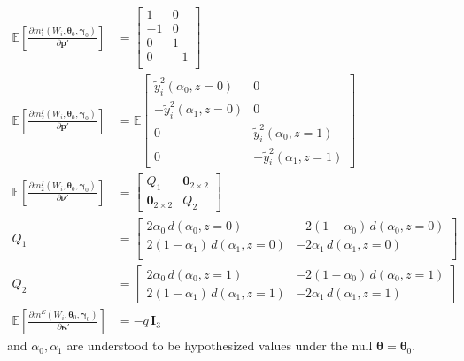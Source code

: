 \documentclass[12pt]{article}
\begin{document}
\begin{align*}
\mathbb{E}\left[\frac{\partial m_1^I(W_i, \boldsymbol{\theta}_0, \boldsymbol{\gamma}_0)}{\partial \mathbf{p}'}\right] &= 
\left[
\begin{array}{rrr}
  1 & 0 \\
  -1 & 0 \\
  0 & 1 \\
  0 & -1 \\
\end{array}
\right] \\
\mathbb{E}\left[\frac{\partial m^I_2(W_i, \boldsymbol{\theta}_0, \boldsymbol{\gamma}_0)}{\partial \mathbf{p}'} \right]
&= \mathbb{E}\left[
\begin{array}{rr}
  \widetilde{y}_i^2(\alpha_0, z=0) & 0 \\
  -\widetilde{y}_i^2(\alpha_1, z=0) & 0 \\
  0 & \widetilde{y}_i^2(\alpha_0, z=1)\\ 
  0 & -\widetilde{y}_i^2(\alpha_1, z=1)
\end{array}
\right]\\
\mathbb{E}\left[\frac{\partial m^I_2(W_i, \boldsymbol{\theta}_0, \boldsymbol{\gamma}_0)}{\partial \boldsymbol{\nu}'} \right]
 &= 
 \left[
 \begin{array}{rr}
   Q_1 & \mathbf{0}_{2\times 2}\\
   \mathbf{0}_{2\times 2} & Q_2
 \end{array}
 \right]\\
 Q_1 &=\left[
\begin{array}{rr}
   2\alpha_0\, d(\alpha_0, z=0)& -2(1 - \alpha_0)\, d(\alpha_0, z=0)\\
   2(1 - \alpha_1)\, d(\alpha_1, z=0)& -2\alpha_1\, d(\alpha_1, z=0) \\
\end{array}
\right]\\
Q_2 &= \left[
\begin{array}{cc}
  2 \alpha_0 \, d(\alpha_0, z=1) &
  -2 (1 - \alpha_0) \, d(\alpha_0, z=1)\\
  2 (1 - \alpha_1)\, d(\alpha_1, z=1) &
  -2\alpha_1 \, d(\alpha_1, z=1)
\end{array}
\right] \\
\mathbb{E}\left[\frac{\partial m^E\left( W_i, \boldsymbol{\theta}_0, \boldsymbol{\gamma}_0 \right)}{\partial \boldsymbol{\kappa}'}\right] &= -q\, \mathbf{I}_3
\end{align*}
and $\alpha_0,\alpha_1$ are understood to be hypothesized values under the null $\boldsymbol{\theta} = \boldsymbol{\theta}_0$.
\end{document}
